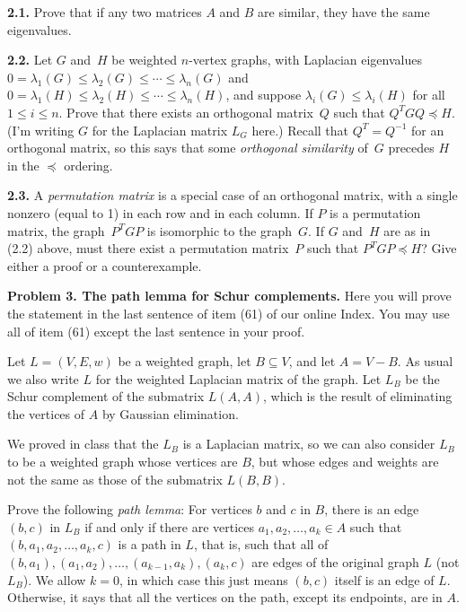 \documentclass[11pt]{article}
\begin{document}
\par\medskip
{\bf 2.1.} 
Prove that if any two matrices $A$ and $B$ are similar, 
they have the same eigenvalues.

\par\medskip
{\bf 2.2.} 
Let $G$ and~$H$ be weighted $n$-vertex graphs, 
with Laplacian eigenvalues
$0=\lambda_1(G)\le\lambda_2(G)\le\cdots\le\lambda_n(G)$ and
$0=\lambda_1(H)\le\lambda_2(H)\le\cdots\le\lambda_n(H)$,
and suppose $\lambda_i(G)\le\lambda_i(H)$ for all $1\le i\le n$.
Prove that there exists an orthogonal matrix~$Q$ such that
$Q^TGQ \preceq H$. 
(I'm writing $G$ for the Laplacian matrix $L_G$ here.)
Recall that $Q^T=Q^{-1}$ for an orthogonal matrix,
so this says that some {\em orthogonal similarity} of~$G$
precedes $H$ in the $\preceq$ ordering.

\par\medskip
{\bf 2.3.} 
A {\em permutation matrix} is a special case of an orthogonal matrix, 
with a single nonzero (equal to 1) in each row and in each column.
If $P$ is a permutation matrix, 
the graph~$P^TGP$ is isomorphic to the graph~$G$.
If $G$ and~$H$ are as in (2.2) above, 
must there exist a permutation matrix~$P$ such that $P^TGP \preceq H$?
Give either a proof or a counterexample.

\par\bigskip
{\bf Problem 3. The path lemma for Schur complements.}
Here you will prove the statement 
in the last sentence of item (61) of our online Index.
You may use all of item (61) except the last sentence in your proof.

Let $L = (V,E,w)$ be a weighted graph, let $B\subseteq V$, and let $A = V-B$.
As usual we also write $L$ for the weighted Laplacian matrix of the graph.
Let $L_B$ be the Schur complement of the submatrix $L(A,A)$, 
which is the result of eliminating the vertices of $A$ by Gaussian elimination.

We proved in class that the $L_B$ is a Laplacian matrix, 
so we can also consider $L_B$ to be a weighted graph whose vertices are $B$,
but whose edges and weights are not the same as those of the submatrix $L(B,B)$.

Prove the following {\em path lemma}:
For vertices $b$ and $c$ in $B$, there is an edge $(b,c)$ in $L_B$ 
if and only if there are vertices $a_1, a_2, \ldots, a_k \in A$ such that
$(b, a_1, a_2, \ldots, a_k, c)$ is a path in $L$,
that is, such that all of $(b,a_1),(a_1,a_2),\ldots,(a_{k-1},a_k),(a_k,c)$
are edges of the original graph $L$ (not $L_B$).
We allow $k = 0$, in which case this just means $(b,c)$ itself is an edge of $L$.
Otherwise, it says that all the vertices on the path, except its endpoints, 
are in $A$.
\end{document}
